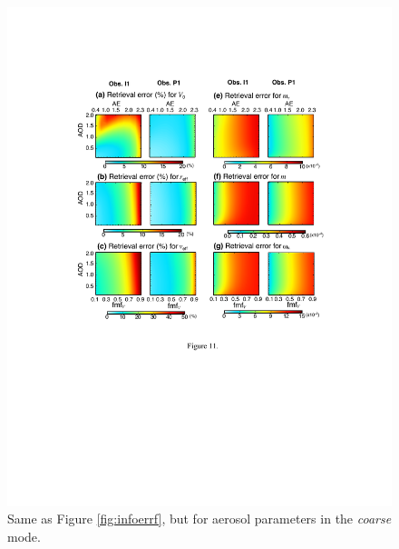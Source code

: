 \begin{figure}[pt]
  \centering
  \includegraphics[width={\textwidth}]{figures/info11.pdf}
  \caption{Same as Figure \ref{fig:infoerrf}, but for aerosol parameters in 
the \textit{coarse} mode.}
  \label{fig:infoerrc}
\end{figure}


